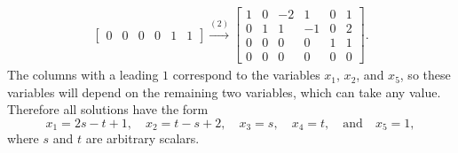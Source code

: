 \begin{solution}
\begin{gather*}
\begin{bmatrix}
      0 & 0 & 0 & 0 & 1 & 1
    \end{bmatrix}
    \xrightarrow{(2)}
    \begin{bmatrix}
      1 & 0 & -2 & 1 & 0 & 1 \\
      0 & 1 & 1 & -1 & 0 & 2 \\
      0 & 0 & 0 & 0 & 1 & 1 \\
      0 & 0 & 0 & 0 & 0 & 0
    \end{bmatrix}.
  \end{gather*}
  The columns with a leading $1$ correspond to the variables $x_1$,
  $x_2$, and $x_5$, so these variables will depend on the remaining
  two variables, which can take any value. Therefore all solutions
  have the form
  \begin{equation*}
    x_1 = 2s - t + 1,
    \quad
    x_2 = t - s + 2,
    \quad
    x_3 = s,
    \quad
    x_4 = t,
    \quad\text{and}\quad
    x_5 = 1,
  \end{equation*}
  where $s$ and $t$ are arbitrary scalars.
\end{solution}
